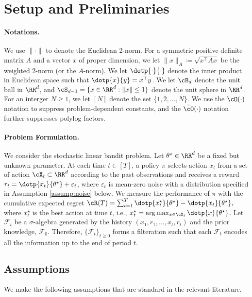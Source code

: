 \section{Setup and Preliminaries}

\paragraph{Notations.} We use $\|\cdot\|$ to denote the Euclidean 2-norm. For a symmetric positive definite matrix $A$ and a vector $x$ of proper dimension, we let $\|x\|_{A}\coloneqq \sqrt{x^\top A x}$ be the weighted 2-norm (or the $A$-norm). We let $\dotp{\cdot}{\cdot}$ denote the inner product in Euclidean  space such that $\dotp{x}{y} = x^\top y$. We let $\cB_d $ denote the unit ball in $\RR^d$, and $\cS_{d-1} = \{x\in\RR^d:\|x\| \leq  1\}$ denote the unit sphere in  $\RR^d$. For an interger $N\geq 1$, we let $[N]$ denote the set $\{1,2,\dots,N\}$. We use the $\cO(\cdot	)$ notation to suppress problem-dependent constants, and the $\tilde{\cO}(\cdot)$ notation further suppresses polylog factors.

\paragraph{Problem Formulation.} We consider the stochastic linear bandit problem. Let $\theta^\star \in \RR^d$ be a fixed but unknown parameter. At each time $t\in[T]$, a policy $\pi$  selects action $x_t$ from a set of action  $\cX_t \subset \RR^d $ according to the past observations and receives a reward $r_t  = \dotp{x_t}{\theta^\star} + \varepsilon_t$, where $ \varepsilon_t$ is mean-zero noise with a distribution specified in Assumption \ref{assump:noise} below. We measure the performance of $\pi$ with the cumulative expected regret 
%
$\cR(T) = \sum_{t= 1}^T\dotp{x^{\star}_t}{\theta^\star} -  \dotp{x_t}{\theta^\star},$
%
where $x^{\star}_t$ is the best action at time $t$, i.e., $x^{\star}_t=\arg\max_{x \in \cX_t}\dotp{x}{\theta^\star}$.
Let $\mathcal{F}_t$ be a $\sigma$-algebra generated by the history $(x_1, r_1, \ldots, x_t, r_t)$ and the prior knowledge, $\mathcal{F}_0$. Therefore, $\{\mathcal{F}_t\}_{t\ge 0}$ forms a filteration such that each $\mathcal{F}_t$ encodes all the information up to the end of period $t$.



\subsection{Assumptions}
We make the following assumptions that are standard in the relevant literature.

